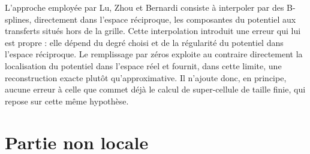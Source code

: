 L'approche employée par Lu, Zhou et Bernardi consiste à interpoler par des B-splines, directement dans l'espace réciproque, les composantes du potentiel aux transferts situés hors de la grille. Cette interpolation introduit une erreur qui lui est propre : elle dépend du degré choisi et de la régularité du potentiel dans l'espace réciproque. Le remplissage par zéros exploite au contraire directement la localisation du potentiel dans l'espace réel et fournit, dans cette limite, une reconstruction exacte plutôt qu'approximative. Il n'ajoute donc, en principe, aucune erreur à celle que commet déjà le calcul de super-cellule de taille finie, qui repose sur cette même hypothèse.

\section{Partie non locale}\label{sec:M_non_local}

